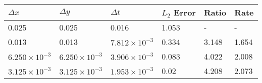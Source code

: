 \begin{tabular}{|l|l|l|l|l|l|}
\hline
\textbf{$\Delta x$}&\textbf{$\Delta y$}&\textbf{$\Delta t$}&\textbf{$L_2$ Error}&\textbf{Ratio}&\textbf{Rate}\\\hline
0.025&0.025&0.016&1.053&-&-\\\hline
0.013&0.013&$7.812 \times 10^{-3}$&0.334&3.148&1.654\\\hline
$6.250 \times 10^{-3}$&$6.250 \times 10^{-3}$&$3.906 \times 10^{-3}$&0.083&4.022&2.008\\\hline
$3.125 \times 10^{-3}$&$3.125 \times 10^{-3}$&$1.953 \times 10^{-3}$&0.02&4.208&2.073\\\hline
\end{tabular}
